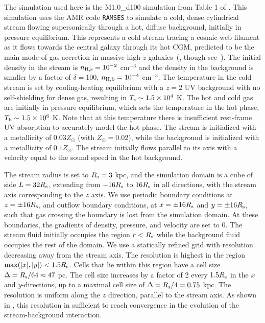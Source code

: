 \documentclass[fleqn,usenatbib]{mnras}
\begin{document}
The simulation used here is the M1.0\_d100 simulation from Table 1 of \cite{mandelker2020Instability}.
This simulation uses the AMR code \texttt{RAMSES} \citep{teyssier2002Cosmological} to simulate a cold, dense cylindrical stream flowing supersonically through a hot, diffuse background, initially in pressure equilibrium.
This represents a cold stream tracing a cosmic-web filament as it flows towards the central galaxy through its hot CGM, predicted to be the main mode of gas accretion in massive high-$z$ galaxies~(\citealt{keres2009Galaxies, dekel2009Cold}, though see~\citealt{nelson2013Moving}).
The initial density in the stream is $n_{\rm H,s}=10^{-2}$ cm$^{-3}$ and the density in the background is smaller by a factor of $\delta=100$, $n_{\rm H,b}=10^{-4}$ cm$^{-3}$.
The temperature in the cold stream is set by cooling-heating equilibrium with a $z=2$ \cite{haardt1996Radiative} UV background with no self-shielding for dense gas, resulting in $T_{\rm s}\sim 1.5 \times 10^4$ K.
The hot and cold gas are initially in pressure equilibrium, which sets the temperature in the hot phase, $T_{\rm b}\sim 1.5 \times 10^6$ K.
Note that at this temperature there is insufficient rest-frame UV absorption to accurately model the hot phase.
The stream is initialized with a metallicity of $0.03 Z_\odot$ (with $Z_\odot = 0.02$), while the background is initialized with a metallicity of $0.1 Z_\odot$.
The stream initially flows parallel to its axis with a velocity equal to the sound speed in the hot background.

The stream radius is set to $R_{\rm s}=3$ kpc, and the simulation domain is a cube of side $L=32R_{\rm s}$, extending from $-16R_{\rm s}$ to $16R_{\rm s}$ in all directions, with the stream axis corresponding to the $z$ axis.
We use periodic boundary conditions at $z=\pm 16R_{\rm s}$, and outflow boundary conditions, at $x=\pm 16R_{\rm s}$ and $y=\pm 16R_{\rm s}$, such that gas crossing the boundary is lost from the simulation domain.
At these boundaries, the gradients of density, pressure, and velocity are set to 0.
The stream fluid initially occupies the region $r<R_{\rm s}$ while the background fluid occupies the rest of the domain.
We use a statically refined grid with resolution decreasing away from the stream axis.
The resolution is highest in the region ${\rm max}(|x|,|y|)<1.5R_{\rm s}$.
Cells that lie within this region have a cell size $\Delta=R_{\rm s}/64\approx 47$ pc.
The cell size increases by a factor of 2 every $1.5R_{\rm s}$ in the $x$ and $y$-directions, up to a maximal cell size of $\Delta=R_{\rm s}/4=0.75$ kpc.
The resolution is uniform along the $z$ direction, parallel to the stream axis.
As shown in \cite{mandelker2020Instability}, this resolution in sufficient to reach convergence in the evolution of the stream-background interaction.
\end{document}
